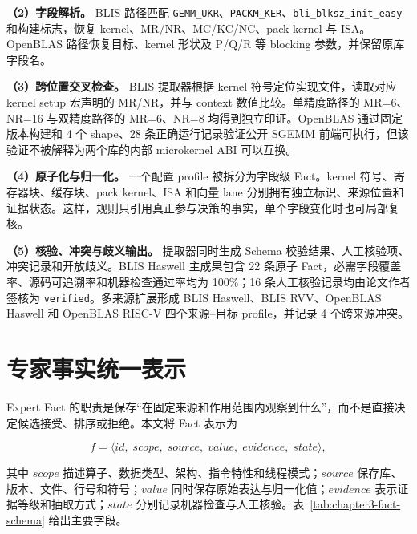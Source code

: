 \textbf{（2）字段解析。} BLIS 路径匹配 \texttt{GEMM\_UKR}、\texttt{PACKM\_KER}、\texttt{bli\_blksz\_init\_easy} 和构建标志，恢复 kernel、MR/NR、MC/KC/NC、pack kernel 与 ISA。OpenBLAS 路径恢复目标、kernel 形状及 P/Q/R 等 blocking 参数，并保留原库字段名。

\textbf{（3）跨位置交叉检查。} BLIS 提取器根据 kernel 符号定位实现文件，读取对应 kernel setup 宏声明的 MR/NR，并与 context 数值比较。单精度路径的 MR=6、NR=16 与双精度路径的 MR=6、NR=8 均得到独立印证。OpenBLAS 通过固定版本构建和 4 个 shape、28 条正确运行记录验证公开 SGEMM 前端可执行，但该验证不被解释为两个库的内部 microkernel ABI 可以互换。

\textbf{（4）原子化与归一化。} 一个配置 profile 被拆分为字段级 Fact。kernel 符号、寄存器块、缓存块、pack kernel、ISA 和向量 lane 分别拥有独立标识、来源位置和证据状态。这样，规则只引用真正参与决策的事实，单个字段变化时也可局部复核。

\textbf{（5）核验、冲突与歧义输出。} 提取器同时生成 Schema 校验结果、人工核验项、冲突记录和开放歧义。BLIS Haswell 主成果包含 22 条原子 Fact，必需字段覆盖率、源码可追溯率和机器检查通过率均为 100\%；16 条人工核验记录均由论文作者签核为 \texttt{verified}。多来源扩展形成 BLIS Haswell、BLIS RVV、OpenBLAS Haswell 和 OpenBLAS RISC-V 四个来源--目标 profile，并记录 4 个跨来源冲突。

\section{专家事实统一表示}

Expert Fact 的职责是保存“在固定来源和作用范围内观察到什么”，而不是直接决定候选接受、排序或拒绝。本文将 Fact 表示为

\begin{equation}
f
=
\langle id,\;scope,\;source,\;value,\;evidence,\;state\rangle,
\label{eq:chapter3-fact-model}
\end{equation}

其中 $scope$ 描述算子、数据类型、架构、指令特性和线程模式；$source$ 保存库、版本、文件、行号和符号；$value$ 同时保存原始表达与归一化值；$evidence$ 表示证据等级和抽取方式；$state$ 分别记录机器检查与人工核验。表~\ref{tab:chapter3-fact-schema} 给出主要字段。

